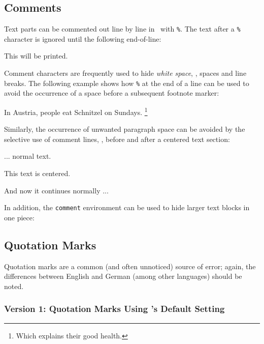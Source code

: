 \subsection{Comments}
\label{sec:comments}

Text parts can be commented out line by line in \latex\ with \verb!%!. The text
after a \verb!%! character is ignored until the following end-of-line:
%
\begin{LaTeXCode}[numbers=none]
This will be printed. %
\end{LaTeXCode}
%
Comment characters are frequently used to hide \emph{white space}, \ie, spaces
and line breaks. The following example shows how \verb!%! at the end of a line
can be used to avoid the occurrence of a space before a subsequent footnote
marker:
%
\begin{LaTeXCode}[numbers=none]
In Austria, people eat Schnitzel on Sundays.%
\footnote{Which explains their good health.}
\end{LaTeXCode}
%
Similarly, the occurrence of unwanted paragraph space can be avoided by the
selective use of comment lines, \eg, before and after a centered text section:
%
\begin{LaTeXCode}[numbers=none]
... normal text.
%
\begin{center}
   This text is centered.
\end{center}
%
And now it continues normally ...
\end{LaTeXCode}
%
In addition, the \verb!comment! environment can be used to hide larger text blocks
in one piece:
\begin{LaTeXCode}[numbers=none]
\begin{comment}
This text ...
   ... is ignored.
\end{comment}
\end{LaTeXCode}


\subsection{Quotation Marks}
\label{sec:quotation-marks}

Quotation marks are a common (and often unnoticed) source of error; again, the
differences between English and German (among other languages) should be noted.

\subsubsection{Version 1: Quotation Marks Using \latex's Default Setting}

